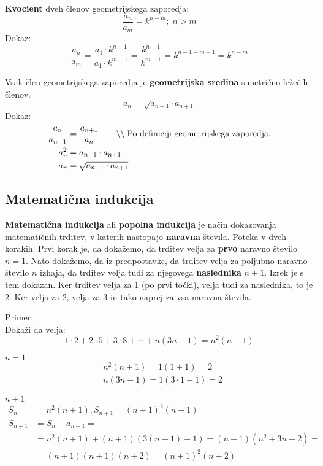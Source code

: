 \documentclass[a4paper,oneside,12pt,fleqn]{article}
\newcommand\krat\cdot
\newcommand{\comment}[1]{\ensuremath{\qquad\backslash\backslash\;}\textnormal{#1}}
\numberwithin{equation}{section}
\newenvironment{enumerate*}%
{
\vspace{-12pt}%
\begin{enumerate}%
\setlength{\itemsep}{0pt}%
\setlength{\parskip}{2pt}}%
{\end{enumerate}}
\begin{document}
\textbf{Kvocient} dveh členov geometrijskega zaporedja:
\[ \frac{a_n}{a_m} = k^{n-m}; \; n > m \]
Dokaz:
\[  \frac{a_n}{a_m} = \frac{a_1\krat k^{n-1}}{a_1\krat k^{m-1}} = \frac{k^{n-1}}{k^{m-1}} =
  k^{n-1-m+1} = k^{n-m} \]

Vsak člen geometrijskega zaporedja je \textbf{geometrijska sredina} simetrično ležečih členov.
\[ a_n = \sqrt{a_{n-1}\krat a_{n+1}} \]
Dokaz:
\begin{align*}
  \frac{a_n}{a_{n-1}} &=  \frac{a_{n+1}}{a_n} \comment{Po definiciji geometrijskega
  zaporedja.} \\
  a_n^2 &= a_{n-1}\krat a_{n+1} \\
  a_n &= \sqrt{a_{n-1}\krat a_{n+1}}
\end{align*}

\subsection{Matematična indukcija}
\label{sec:zap:ind}
\textbf{Matematična indukcija} ali \textbf{popolna indukcija} je način dokazovanja matematičnih trditev, v
katerih nastopajo \textbf{naravna} števila. Poteka v dveh korakih. Prvi korak je, da dokažemo, da
trditev velja za \textbf{prvo} naravno število $n = 1$. Nato dokažemo, da iz predpostavke, da
trditev velja za poljubno naravno število $n$ izhaja, da trditev velja tudi za njegovega
\textbf{naslednika} $n +
1$. Izrek je s tem dokazan. Ker trditev velja za 1 (po prvi točki), velja tudi za
naslednika, to je 2. Ker velja za 2, velja za 3 in tako naprej za vsa naravna števila.

Primer: \\
Dokaži da velja:
\[ 1\krat 2 + 2\krat 5 + 3\krat 8 + \cdots + n(3n-1) = n^2(n+1) \]
\begin{enumerate*}
  \item $n = 1$
    \begin{align*}
      & n^2(n+1) = 1(1+1) = 2 \\
      & n(3n-1) = 1(3\krat 1 - 1) = 2
    \end{align*}
  \item $n + 1$
    \begin{align*}
      S_n &= n^2(n+1), S_{n+1} = (n+1)^2(n+1) \\
      S_{n+1} &= S_n + a_{n+1} = \\
      & = n^2(n+1) + (n+1)(3(n+1)-1) = (n+1)(n^2 + 3n + 2) = \\
      & = (n+1)(n+1)(n+2) = (n+1)^2(n+2)
    \end{align*}
\end{enumerate*}
\end{document}
